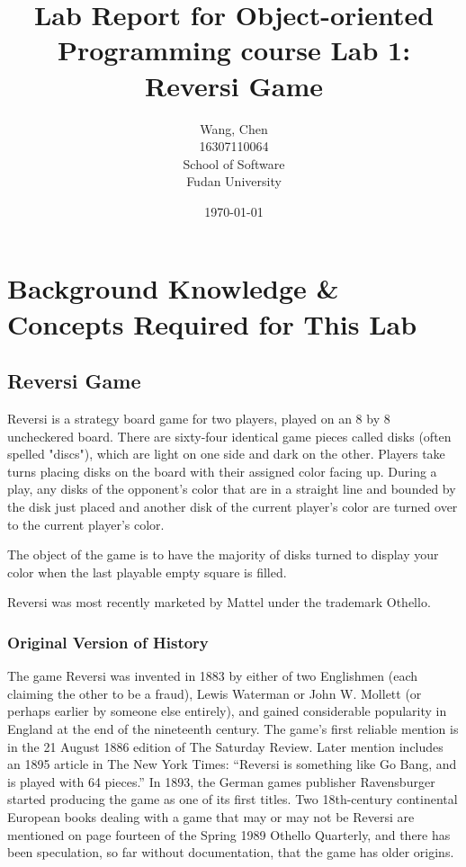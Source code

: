 \documentclass[a4paper]{report}
\title{Lab Report for Object-oriented Programming course \newline
 Lab 1: Reversi Game}
\author{Wang, Chen \\ 16307110064 \\ School of Software\\ Fudan University}
\date{\today}
\begin{document}
\maketitle

\tableofcontents

\chapter{Background Knowledge \& Concepts Required for This Lab}
\section{Reversi Game}
Reversi is a strategy board game for two players, played on an 8 by 8 uncheckered board. There are sixty-four identical game pieces called disks (often spelled "discs"), which are light on one side and dark on the other. Players take turns placing disks on the board with their assigned color facing up. During a play, any disks of the opponent's color that are in a straight line and bounded by the disk just placed and another disk of the current player's color are turned over to the current player's color. 
\par
The object of the game is to have the majority of disks turned to display your color when the last playable empty square is filled. 
\par
Reversi was most recently marketed by Mattel under the trademark Othello. 

\subsection{Original Version of History}
The game Reversi was invented in 1883 by either of two Englishmen (each claiming the other to be a fraud), Lewis Waterman or John W. Mollett (or perhaps earlier by someone else entirely), and gained considerable popularity in England at the end of the nineteenth century. The game's first reliable mention is in the 21 August 1886 edition of The Saturday Review. Later mention includes an 1895 article in The New York Times: ``Reversi is something like Go Bang, and is played with 64 pieces.'' In 1893, the German games publisher Ravensburger started producing the game as one of its first titles. Two 18th-century continental European books dealing with a game that may or may not be Reversi are mentioned on page fourteen of the Spring 1989 Othello Quarterly, and there has been speculation, so far without documentation, that the game has older origins.
\end{document}
